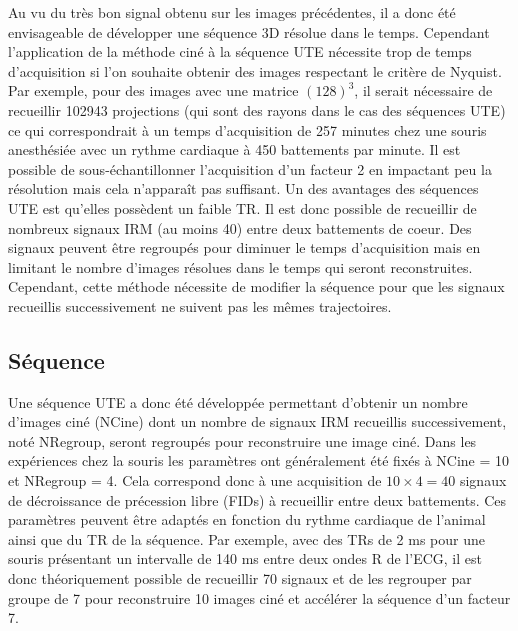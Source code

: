 Au vu du très bon signal obtenu sur les images précédentes, il a donc été envisageable de développer une séquence 3D résolue dans le temps. Cependant l'application de la méthode ciné à la séquence UTE nécessite trop de temps d'acquisition si l'on souhaite obtenir des images respectant le critère de Nyquist. Par exemple, pour des images avec une matrice $(128)^3$, il serait nécessaire de recueillir 102943 projections (qui sont des rayons dans le cas des séquences UTE) ce qui correspondrait à un temps d'acquisition de 257 minutes chez une souris anesthésiée avec un rythme cardiaque à 450 battements par minute. Il est possible de sous-échantillonner l'acquisition d'un facteur 2 en impactant peu la résolution mais cela n'apparaît pas suffisant.
Un des avantages des séquences UTE est qu'elles possèdent un faible TR. Il est donc possible de recueillir de nombreux signaux IRM (au moins 40) entre deux battements de coeur. Des signaux peuvent être regroupés pour diminuer le temps d'acquisition mais en limitant le nombre d'images résolues dans le temps qui seront reconstruites. 
Cependant, cette méthode nécessite de modifier la séquence pour que les signaux recueillis successivement ne suivent pas les mêmes trajectoires.


\subsection{Séquence}

Une séquence UTE a donc été développée permettant d'obtenir un nombre d'images ciné (NCine) dont un nombre de signaux IRM recueillis successivement, noté NRegroup, seront regroupés pour reconstruire une image ciné. Dans les expériences chez la souris les paramètres ont généralement été fixés à NCine = 10 et NRegroup = 4. Cela correspond donc à une acquisition de $10 \times 4 = 40$ signaux de décroissance de précession libre (FIDs) à recueillir entre deux battements. Ces paramètres peuvent être adaptés en fonction du rythme cardiaque de l'animal ainsi que du TR de la séquence. Par exemple, avec des TRs de 2 ms pour une souris présentant un intervalle de 140 ms entre deux ondes R de l'ECG, il est donc théoriquement possible de recueillir 70 signaux et de les regrouper par groupe de 7 pour reconstruire 10 images ciné et accélérer la séquence d'un facteur 7.

